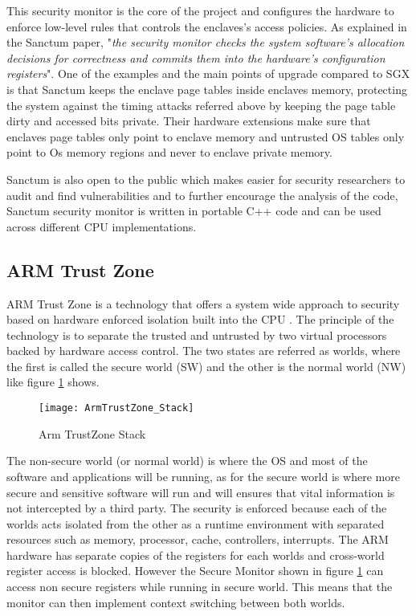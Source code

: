 This security monitor is the core of the project and configures the hardware to enforce low-level rules that controls the enclaves's access policies. As explained in the Sanctum paper, "\textit{the security monitor checks the system software’s allocation decisions for correctness and commits them into the hardware’s configuration registers}". One of the examples and the main points of upgrade compared to \gls{SGX} is that Sanctum keeps the enclave page tables inside enclaves memory, protecting the system against the timing attacks referred above by keeping the page table dirty and accessed bits private. Their hardware extensions make sure that enclaves page tables only point to enclave memory and untrusted OS tables only point to Os memory regions and never to enclave private memory.

Sanctum is also open to the public which makes easier for security researchers to audit and find vulnerabilities and to further encourage the analysis of the code, Sanctum security monitor is written in portable C++ code and can be used across different CPU implementations.

\subsection{ARM Trust Zone} %
\label{ssec:arm_trust_zone}

ARM Trust Zone \cite{armtrustzone:1} is a technology that offers a system wide approach to security based on hardware enforced isolation built into the CPU \cite{armtrustzone:2}. The principle of the technology is to separate the trusted and untrusted by two virtual processors backed by hardware access control. The two states are referred as worlds, where the first is called the secure world (SW) and the other is the normal world (NW) like figure \ref{fig:armtrustzone_stack} shows.

\begin{figure}[htbp]
	\centering
	{\texttt{[image: ArmTrustZone\_Stack]}}%
	\caption{Arm TrustZone Stack \cite{armtrustzone:3}}
	\label{fig:armtrustzone_stack}
\end{figure}

The non-secure world (or normal world) is where the \gls{OS} and most of the software and applications will be running, as for the secure world is where more secure and sensitive software will run and will ensures that vital information is not intercepted by a third party. The security is enforced because each of the worlds acts isolated from the other as a runtime environment with separated resources such as memory, processor, cache, controllers, interrupts. The ARM hardware has separate copies of the registers for each worlds and cross-world register access is blocked. However the Secure Monitor shown in figure \ref{fig:armtrustzone_stack} can access non secure registers while running in secure world. This means that the monitor can then implement context switching between both worlds.

